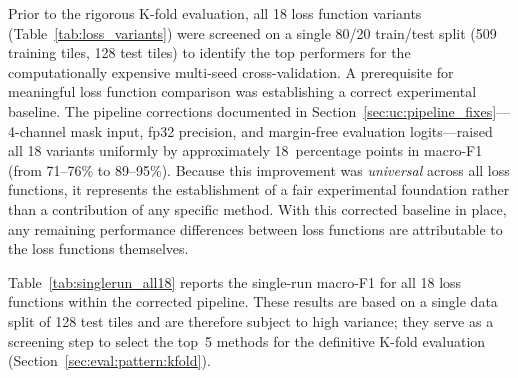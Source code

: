 Prior to the rigorous K-fold evaluation, all 18 loss function variants
(Table~\ref{tab:loss_variants}) were screened on a single 80/20
train/test split (509 training tiles, 128 test tiles) to identify the
top performers for the computationally expensive multi-seed
cross-validation.
A prerequisite for meaningful loss function comparison was establishing
a correct experimental baseline.
The pipeline corrections documented in
Section~\ref{sec:uc:pipeline_fixes}---4-channel mask input, fp32
precision, and margin-free evaluation logits---raised all 18 variants
uniformly by approximately 18~percentage points in macro-F1 (from
71--76\% to 89--95\%).
Because this improvement was \emph{universal} across all loss functions,
it represents the establishment of a fair experimental foundation
rather than a contribution of any specific method.
With this corrected baseline in place, any remaining performance
differences between loss functions are attributable to the loss
functions themselves.

Table~\ref{tab:singlerun_all18} reports the single-run macro-F1 for all
18 loss functions within the corrected pipeline.
These results are based on a single data split of 128 test tiles and
are therefore subject to high variance; they serve as a screening step
to select the top~5 methods for the definitive K-fold evaluation
(Section~\ref{sec:eval:pattern:kfold}).

